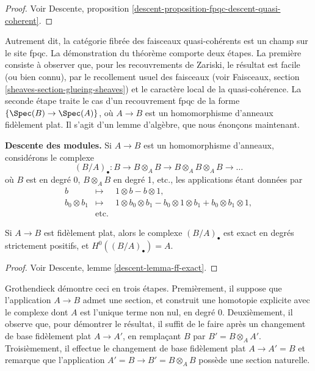 \begin{proof}
Voir
Descente, proposition \ref{descent-proposition-fpqc-descent-quasi-coherent}.
\end{proof}

\noindent
Autrement dit, la cat\'egorie fibr\'ee des faisceaux quasi-coh\'erents est un champ
sur le site fpqc.
La d\'emonstration du th\'eor\`eme comporte deux \'etapes. La premi\`ere consiste \`a observer
que, pour les recouvrements de Zariski, le r\'esultat est facile (ou bien connu), par
le recollement usuel des faisceaux (voir
Faisceaux, section \ref{sheaves-section-glueing-sheaves})
et le caract\`ere local de la quasi-coh\'erence. La seconde \'etape traite le cas d'un
recouvrement fpqc de la forme $\{\Spec(B) \to \Spec(A)\}$,
o\`u $A \to B$ est un homomorphisme d'anneaux fid\`element plat.
Il s'agit d'un lemme d'alg\`ebre, que nous \'enon\c{c}ons maintenant.

\medskip\noindent
{\bf Descente des modules.}
Si $A \to B$ est un homomorphisme d'anneaux, consid\'erons le complexe
$$
(B/A)_\bullet : B \to B \otimes_A B \to B \otimes_A B \otimes_A B \to \ldots
$$
o\`u $B$ est en degr\'e 0, $B \otimes_A B$ en degr\'e 1, etc., les applications \'etant
donn\'ees par
\begin{eqnarray*}
b & \mapsto & 1 \otimes b - b \otimes 1, \\
b_0 \otimes b_1 & \mapsto & 1 \otimes b_0 \otimes b_1 - b_0 \otimes 1 \otimes
b_1 + b_0 \otimes b_1 \otimes 1, \\
& \text{etc.}
\end{eqnarray*}

\begin{lemma}
\label{lemma-algebra-descent}
Si $A \to B$ est fid\`element plat, alors le complexe $(B/A)_\bullet$ est exact en
degr\'es strictement positifs, et $H^0((B/A)_\bullet) = A$.
\end{lemma}

\begin{proof}
Voir Descente, lemme \ref{descent-lemma-ff-exact}.
\end{proof}

\noindent
Grothendieck d\'emontre ceci en trois \'etapes. Premi\`erement, il suppose que l'application $A
\to B$ admet une section, et construit une homotopie explicite avec le complexe dont
$A$ est l'unique terme non nul, en degr\'e 0. Deuxi\`emement, il observe que, pour d\'emontrer
le r\'esultat, il suffit de le faire apr\`es un changement de base fid\`element plat $A \to
A'$, en rempla\c{c}ant $B$ par $B' = B \otimes_A A'$. Troisi\`emement, il effectue le
changement de base fid\`element plat $A \to A' = B$ et remarque que l'application
$A' = B \to B' = B \otimes_A B$ poss\`ede une section naturelle.

